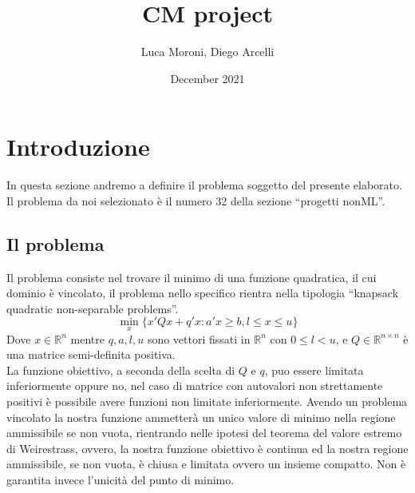 \documentclass[12pt]{extarticle}
\title{CM project}
\author{Luca Moroni, Diego Arcelli}
\date{December 2021}
\newcommand{\quotes}[1]{``#1''}
\begin{document}
\maketitle

\section{Introduzione}
In questa sezione andremo a definire il problema soggetto del presente elaborato. Il problema da noi selezionato è il numero 32 della sezione   \quotes{progetti nonML}.
\subsection{Il problema}
Il problema consiste nel trovare il minimo di una funzione quadratica, il cui dominio è vincolato, il problema nello specifico rientra nella tipologia \quotes{knapsack quadratic non-separable problems}.\\
\[\min_x \{x'Qx + q'x : a'x \geq b, l \leq x \leq u\}\]
Dove $x \in \mathbb{R}^n$ mentre $q, a, l, u$  sono vettori fissati in $\mathbb{R}^n$ con $0 \leq l < u$, e $Q \in \mathbb{R}^{n \times n}$ è una matrice semi-definita positiva.\\
La funzione obiettivo, a seconda della scelta di $Q$ e $q$, puo essere limitata inferiormente oppure no, nel caso di matrice con autovalori non strettamente positivi è possibile avere funzioni non limitate inferiormente. Avendo un problema vincolato la nostra funzione ammetterà un unico valore di minimo nella regione ammissibile se non vuota, rientrando nelle ipotesi del teorema del valore estremo di Weirestrass, ovvero, la nostra funzione obiettivo è continua ed la nostra regione ammissibile, se non vuota, è chiusa e limitata ovvero un insieme compatto. Non è garantita invece l'unicità del punto di minimo.
\end{document}
